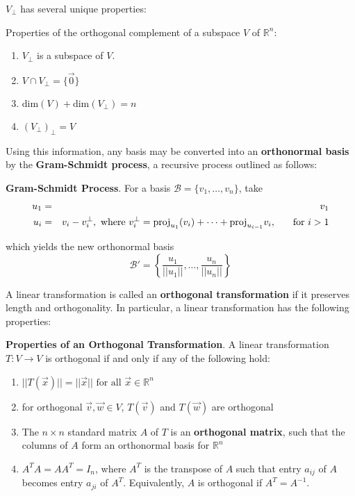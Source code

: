 $V_\perp$ has several unique properties:

\begin{shaded}
    Properties of the orthogonal complement of a subspace $V$ of $\mathbb{R}^n$:
    \begin{enumerate}
        \item $V_\perp$ is a subspace of $V$.
        \item $V\cap V_\perp =\{\vec{0}\}$
        \item $\text{dim}(V) + \text{dim}(V_\perp) = n$
        \item $(V_\perp)_\perp = V$
    \end{enumerate}
\end{shaded}

Using this information, any basis may be converted into an \textbf{orthonormal basis} by the \textbf{Gram-Schmidt process}, a recursive process outlined as follows:

\begin{shaded}
\textbf{Gram-Schmidt Process}. For a basis $\mathcal{B}=\{v_1,\dots,v_n\}$, take
\begin{eqnarray*}
    u_1 &=& v_1\\
    u_i &=& v_i - v_i^\perp,\text{ where } v_i^\perp = \text{proj}_{u_1}(v_i) + \dots + \text{proj}_{u_{i-1}}v_i,\hspace{0.2in}\text{ for }i>1
\end{eqnarray*}

which yields the new orthonormal basis \[\mathcal{B'} = \left\{\frac{u_1}{||u_1||},\dots,\frac{u_n}{||u_n||}\right\}\]
\end{shaded}

A linear transformation is called an \textbf{orthogonal transformation} if it preserves length and orthogonality. In particular, a linear transformation has the following properties:

\begin{shaded}
    \textbf{Properties of an Orthogonal Transformation}. A linear transformation $T:V\to V$ is orthogonal if and only if any of the following hold: \begin{enumerate}
        \item $||T(\vec{x})|| = ||\vec{x}||\text{ for all }\vec{x}\in\mathbb{R}^n$
        \item for orthogonal $\vec{v},\vec{w}\in V$, $T(\vec{v})$ and $T(\vec{w})$ are orthogonal
        \item The $n\times n$ standard matrix $A$ of $T$ is an \textbf{orthogonal matrix}, such that the columns of $A$ form an orthonormal basis for $\mathbb{R}^n$
        \item $A^TA = AA^T = I_n$, where $A^T$ is the transpose of $A$ such that entry $a_{ij}$ of $A$ becomes entry $a_{ji}$ of $A^T$. Equivalently, $A$ is orthogonal if $A^T=A^{-1}$.
    \end{enumerate}
\end{shaded}

